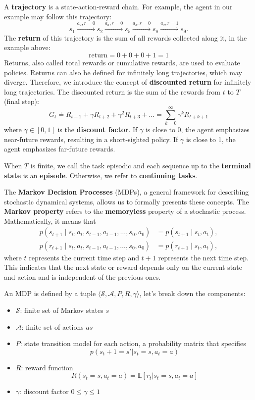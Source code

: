A \textbf{trajectory} is a state-action-reward chain.
For example, the agent in our example may follow this trajectory:
\[ s_1 \xrightarrow{a_2, r=0} s_2 \xrightarrow{a_3, r=0} s_5 \xrightarrow{a_3, r=0} s_8 \xrightarrow{a_2, r=1} s_9. \]
The \textbf{return} of this trajectory is the sum of all rewards collected along it,
in the example above:
\[\text{return} = 0+0+0+1=1\]
Returns, also called total rewards or cumulative rewards,
are used to evaluate policies.
Returns can also be defined for infinitely long trajectories, which may diverge.
Therefore, we introduce the concept of \textbf{discounted return} for infinitely
long trajectories. The discounted return is the sum of the rewards from $t$ to $T$ (final step):
\[
G_t \doteq R_{t+1} + \gamma R_{t+2} + \gamma^2 R_{t+3} + \ldots = \sum_{k=0}^{\infty} \gamma^k R_{t+k+1}
\]
where \( \gamma \in [0, 1] \) is the \textbf{discount factor}.
If \( \gamma \) is close to 0, the agent emphasizes near-future rewards,
resulting in a short-sighted policy. If \( \gamma \) is close to 1,
the agent emphasizes far-future rewards.

When $T$ is finite, we call the task episodic and each sequence
up to the \textbf{terminal state} is an \textbf{episode}. Otherwise, we refer
to \textbf{continuing tasks}.

The \textbf{Markov Decision Processes} (MDPs),
a general framework for describing stochastic dynamical systems,
allows us to formally presents these concepts.
The \textbf{Markov property} refers to the \textbf{memoryless} property of a stochastic process. Mathematically, it means that
\[
\begin{aligned}
p(s_{t+1} \mid s_t, a_t, s_{t-1}, a_{t-1}, \ldots, s_0, a_0) &= p(s_{t+1} \mid s_t, a_t), \\
p(r_{t+1} \mid s_t, a_t, s_{t-1}, a_{t-1}, \ldots, s_0, a_0) &= p(r_{t+1} \mid s_t, a_t),
\end{aligned}
\]
where \( t \) represents the current time step and \( t + 1 \) represents the next time step.
This indicates that the next state or reward depends only on the current
state and action and is independent of the previous ones.

\vspace{3cm}

An MDP is defined by a tuple \( \langle \mathcal{S}, \mathcal{A}, P, R, \gamma \rangle \),
let's break down the components:
\begin{itemize}
    \item \( \mathcal{S} \): finite set of Markov states $s$
    \item \( \mathcal{A} \): finite set of actions $as$
    \item \( P \): state transition model for each action,
    a probability matrix that specifies $$p(s_t+1 = s'|s_t=s, a_t=a)$$
    \item \( R \): reward function
    $$ R(s_t=s, a_t=a) = \mathbb{E} [r_t | s_t = s, a_t = a] $$
    \item \( \gamma \): discount factor $0 \leq \gamma \leq 1$
\end{itemize}

